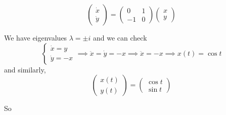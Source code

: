 \documentclass[12pt]{report}
\begin{document}
\[\begin{pmatrix}
        \dot x \\ \dot y
    \end{pmatrix} = \begin{pmatrix}
        0  & 1 \\
        -1 & 0
    \end{pmatrix} \begin{pmatrix}
        x \\y
    \end{pmatrix}\]

We have eigenvalues $\lambda = \pm i$ and we can check
\[\begin{cases}
        \dot x = y \\
        \dot y = -x
    \end{cases} \implies \ddot x = \dot y = -x \implies \ddot x = -x \implies x(t) = \cos t\]
and similarly,
\[\begin{pmatrix}
        x(t) \\
        y(t)
    \end{pmatrix} = \begin{pmatrix}
        \cos t \\
        \sin t
    \end{pmatrix}\]

So
\end{document}
